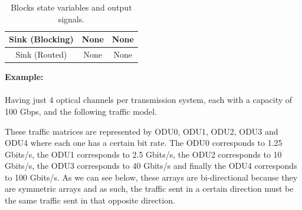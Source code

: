 \begin{table}[H]
\begin{tabular}{|c|c|c|}
	Sink (Blocking)                                                       & None                                                                                        & None                                                                    \\ \hline
	Sink (Routed)                                                         & None                                                                                        & None                                                                    \\ \hline
\end{tabular}
	\caption{Blocks state variables and output signals.}
	\label{blocks_input}
\end{table}
\clearpage
\textbf{Example:}  \\
\\
Having just 4 optical channels per transmission system, each with a capacity of 100 Gbps, and the following traffic model.

These traffic matrices are represented by ODU0, ODU1, ODU2, ODU3 and ODU4 where each one has a certain bit rate.
The ODU0 corresponds to 1.25 Gbits/s, the ODU1 corresponds to 2.5 Gbits/s, the ODU2 corresponds to 10 Gbits/s, the ODU3 corresponds to 40 Gbits/s and finally the ODU4 corresponds to 100 Gbits/s.
As we can see below, these arrays are bi-directional because they are symmetric arrays and as such, the traffic sent in a certain direction must be the same traffic sent in that opposite direction.

